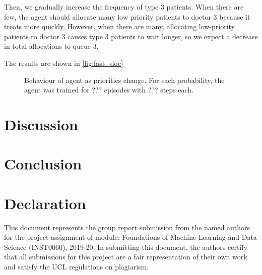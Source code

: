 \documentclass[11point]{article}
\begin{document}
Then, we gradually increase the frequency of type 3 patients.
When there are few, the agent should allocate many low priority patients to doctor 3 because it treats more quickly. However, when there are many, allocating low-priority patients to doctor 3 causes type 3 patients to wait longer, so we expect a decrease in total allocations to queue 3.

The results are shown in \autoref{fig:fast_doc}

\begin{figure}
    \centering
    \caption{Behaviour of agent as priorities change. For each probability, the agent was trained for ??? episodes with ??? steps each.}
    \label{fig:fast_doc}
\end{figure}

\section{Discussion}

\section{Conclusion}


\section*{Declaration}
This document represents the group report submission from the named authors for the project assignment of module: Foundations of Machine Learning and Data Science (INST0060), 2019-20. In submitting this document, the authors certify that all submissions for this project are a fair representation of their own work and satisfy the UCL regulations on  plagiarism.



\end{document}
